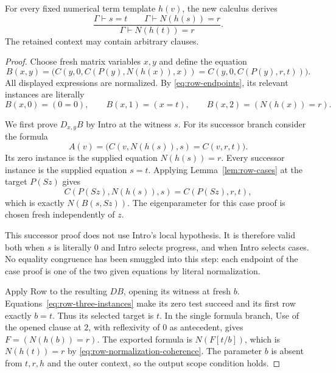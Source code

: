 \begin{theorem}
\label{thm:row-term-transport}
For every fixed numerical term template $h(v)$, the new calculus derives
\[
 \frac{\Gamma\vdash s=t\qquad\Gamma\vdash N(h(s))=r}
      {\Gamma\vdash N(h(t))=r}.
\]
The retained context may contain arbitrary clauses.
\end{theorem}
\begin{proof}
Choose fresh matrix variables $x,y$ and define the equation
\[
 B(x,y)=\bigl(
 C(y,0,C(P(y),N(h(x)),x))
 =C(y,0,C(P(y),r,t))\bigr).
\]
All displayed expressions are normalized.  By
\eqref{eq:row-endpoints}, its relevant instances are literally
\begin{equation}
 B(x,0)=(0=0),\qquad B(x,1)=(x=t),\qquad
 B(x,2)=(N(h(x))=r).
 \label{eq:row-three-instances}
\end{equation}

We first prove $D_{x,y}B$ by Intro at the witness $s$.  For its successor
branch consider the formula
\[
 A(v)=\bigl(C(v,N(h(s)),s)=C(v,r,t)\bigr).
\]
Its zero instance is the supplied equation $N(h(s))=r$.  Every successor
instance is the supplied equation $s=t$.  Applying
Lemma~\ref{lem:row-cases} at the target $P(Sz)$ gives
\[
 C(P(Sz),N(h(s)),s)=C(P(Sz),r,t),
\]
which is exactly $N(B(s,Sz))$.  The eigenparameter for this case proof is
chosen fresh independently of $z$.

This successor proof does not use Intro's local hypothesis.  It is
therefore valid both when $s$ is literally $0$ and Intro selects progress,
and when Intro selects cases.  No equality congruence has been smuggled
into this step: each endpoint of the case proof is one of the two given
equations by literal normalization.

Apply Row to the resulting $D B$, opening its witness at fresh $b$.
Equations~\eqref{eq:row-three-instances} make its zero test succeed and
its first row exactly $b=t$.  Thus its selected target is $t$.  In the
single formula branch, Use of the opened clause at $2$, with reflexivity
of $0$ as antecedent, gives $F=(N(h(b))=r)$.  The exported formula is
$N(F[t/b])$, which is $N(h(t))=r$ by
\eqref{eq:row-normalization-coherence}.  The parameter $b$ is absent from
$t,r,h$ and the outer context, so the output scope condition holds.
\end{proof}

